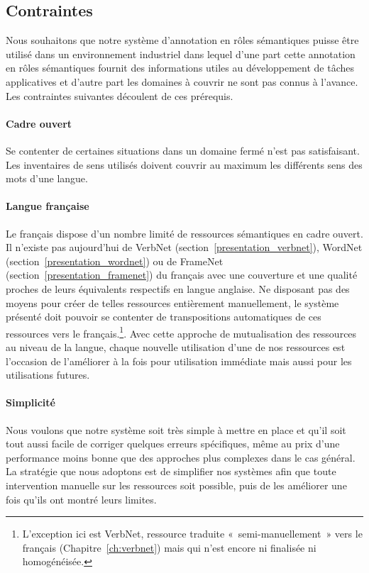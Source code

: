 \subsection{Contraintes}

Nous souhaitons que notre système d'annotation en rôles sémantiques puisse être
utilisé dans un environnement industriel dans lequel d'une part cette
annotation en rôles sémantiques fournit des informations utiles au
développement de tâches applicatives et d'autre part les domaines à couvrir ne
sont pas connus à l'avance. Les contraintes suivantes découlent de ces
prérequis.

\paragraph{Cadre ouvert} Se contenter de certaines situations dans un domaine
fermé n'est pas satisfaisant. Les inventaires de sens utilisés doivent couvrir
au maximum les différents sens des mots d'une langue.

\paragraph{Langue française} Le français dispose d'un nombre limité de
ressources sémantiques en cadre ouvert. Il n'existe pas aujourd'hui de VerbNet
(section~\ref{presentation_verbnet}), WordNet
(section~\ref{presentation_wordnet}) ou de FrameNet
(section~\ref{presentation_framenet}) du français avec une couverture et une
qualité proches de leurs équivalents respectifs en langue anglaise. Ne
disposant pas des moyens pour créer de telles ressources entièrement
manuellement, le système présenté doit pouvoir se contenter de transpositions
automatiques de ces ressources vers le français.\footnote{L'exception ici est
VerbNet, ressource traduite «~semi-manuellement~» vers le français
(Chapitre~\ref{ch:verbnet}) mais qui n'est encore ni finalisée ni
homogénéisée.}. Avec cette approche de mutualisation des ressources au niveau de
la langue, chaque nouvelle utilisation d'une de nos ressources est l'occasion
de l'améliorer à la fois pour utilisation immédiate mais aussi pour les
utilisations futures.

\paragraph{Simplicité} Nous voulons que notre système soit très simple à mettre
en place et qu'il soit tout aussi facile de corriger quelques erreurs
spécifiques, même au prix d'une performance moins bonne que des approches plus
complexes dans le cas général. La stratégie que nous adoptons est de simplifier
nos systèmes afin que toute intervention manuelle sur les ressources soit
possible, puis de les améliorer une fois qu'ils ont montré leurs limites.

